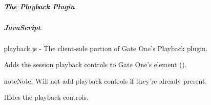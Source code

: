 \documentclass[letterpaper,10pt,openany]{sphinxmanual}
\begin{document}
\subparagraph{The Playback Plugin}
\label{Applications/terminal/plugin_playback:the-playback-plugin}\label{Applications/terminal/plugin_playback::doc}

\subparagraph{JavaScript}
\label{Applications/terminal/plugin_playback:javascript}
playback.js - The client-side portion of Gate One's Playback plugin.

\begin{fulllineitems}
\label{Applications/terminal/plugin_playback:GateOne.Playback.addControls}
Adds the session playback controls to Gate One's element ().

\begin{notice}{note}{Note:}
Will not add playback controls if they're already present.
\end{notice}

\end{fulllineitems}


\begin{fulllineitems}
\label{Applications/terminal/plugin_playback:GateOne.Playback.hideControls}
Hides the playback controls.

\end{fulllineitems}

\end{document}
